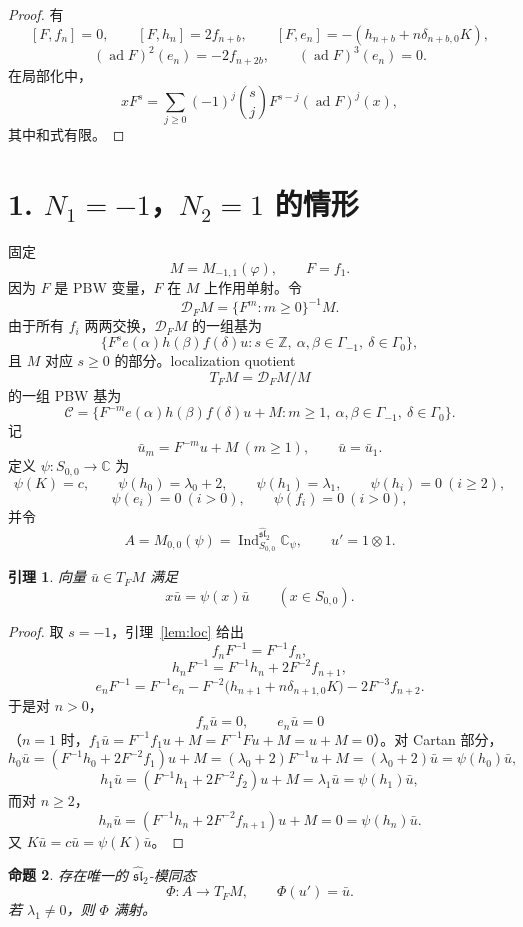 \documentclass[UTF8,11pt]{ctexart}
\newcommand{\C}{\mathbb C}
\newcommand{\Z}{\mathbb Z}
\newcommand{\G}{\Gamma}
\newcommand{\slh}{\widehat{\mathfrak{sl}}_2}
\newcommand{\D}{\mathcal D}
\newcommand{\Ind}{\operatorname{Ind}}
\newcommand{\ad}{\operatorname{ad}}
\theoremstyle{plain}
\newtheorem{proposition}{命题}
\newtheorem{lemma}[proposition]{引理}
\theoremstyle{definition}
\begin{document}
\begin{proof}
有
\[
  [F,f_n]=0,\qquad
  [F,h_n]=2f_{n+b},\qquad
  [F,e_n]=-(h_{n+b}+n\delta_{n+b,0}K),
\]
\[
  (\ad F)^2(e_n)=-2f_{n+2b},\qquad
  (\ad F)^3(e_n)=0.
\]
在局部化中，
\[
  xF^s=\sum_{j\ge0}(-1)^j\binom{s}{j}F^{s-j}(\ad F)^j(x),
\]
其中和式有限。
\end{proof}

\section*{1. \(N_1=-1\)，\(N_2=1\) 的情形}

固定
\[
  M=M_{-1,1}(\varphi),\qquad F=f_1.
\]
因为 \(F\) 是 PBW 变量，\(F\) 在 \(M\) 上作用单射。令
\[
  \D_FM=\{F^m:m\ge0\}^{-1}M.
\]
由于所有 \(f_i\) 两两交换，\(\D_FM\) 的一组基为
\[
  \{F^s e(\alpha)h(\beta)f(\delta)u:
  s\in\Z,\ \alpha,\beta\in\G_{-1},\ \delta\in\G_0\},
\]
且 \(M\) 对应 \(s\ge0\) 的部分。localization quotient
\[
  T_FM=\D_FM/M
\]
的一组 PBW 基为
\[
  \mathcal C
  =
  \{F^{-m}e(\alpha)h(\beta)f(\delta)u+M:
  m\ge1,\ \alpha,\beta\in\G_{-1},\ \delta\in\G_0\}.
\]
记
\[
  \bar u_m=F^{-m}u+M\ (m\ge1),\qquad
  \bar u=\bar u_1.
\]
定义 \(\psi:S_{0,0}\to\C\) 为
\[
  \psi(K)=c,\qquad
  \psi(h_0)=\lambda_0+2,\qquad
  \psi(h_1)=\lambda_1,\qquad
  \psi(h_i)=0\ (i\ge2),
\]
\[
  \psi(e_i)=0\ (i>0),\qquad
  \psi(f_i)=0\ (i>0),
\]
并令
\[
  A=M_{0,0}(\psi)=\Ind_{S_{0,0}}^{\slh}\C_\psi,
  \qquad
  u'=1\otimes1.
\]

\begin{lemma}\label{lem:cyc}
向量 \(\bar u\in T_FM\) 满足
\[
  x\bar u=\psi(x)\bar u\qquad(x\in S_{0,0}).
\]
\end{lemma}

\begin{proof}
取 \(s=-1\)，引理~\ref{lem:loc} 给出
\[
  f_nF^{-1}=F^{-1}f_n,
\]
\[
  h_nF^{-1}=F^{-1}h_n+2F^{-2}f_{n+1},
\]
\[
  e_nF^{-1}
  =
  F^{-1}e_n
  -F^{-2}\bigl(h_{n+1}+n\delta_{n+1,0}K\bigr)
  -2F^{-3}f_{n+2}.
\]
于是对 \(n>0\)，
\[
  f_n\bar u=0,\qquad e_n\bar u=0
\]
（\(n=1\) 时，\(f_1\bar u=F^{-1}f_1u+M=F^{-1}Fu+M=u+M=0\)）。对 Cartan
部分，
\[
  h_0\bar u=(F^{-1}h_0+2F^{-2}f_1)u+M
  =(\lambda_0+2)F^{-1}u+M
  =(\lambda_0+2)\bar u
  =\psi(h_0)\bar u,
\]
\[
  h_1\bar u=(F^{-1}h_1+2F^{-2}f_2)u+M=\lambda_1\bar u=\psi(h_1)\bar u,
\]
而对 \(n\ge2\)，
\[
  h_n\bar u=(F^{-1}h_n+2F^{-2}f_{n+1})u+M=0=\psi(h_n)\bar u.
\]
又 \(K\bar u=c\bar u=\psi(K)\bar u\)。
\end{proof}

\begin{proposition}\label{prop:phi}
存在唯一的 \(\slh\)-模同态
\[
  \Phi:A\longrightarrow T_FM,\qquad \Phi(u')=\bar u.
\]
若 \(\lambda_1\ne0\)，则 \(\Phi\) 满射。
\end{proposition}
\end{document}
